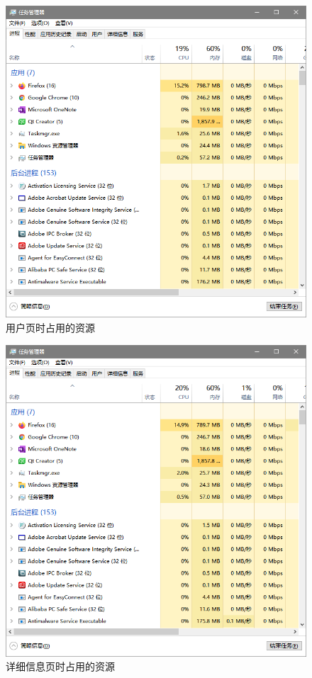\documentclass{beamer}
\begin{document}
\begin{frame}
    \begin{figure}
        \centering
        \includegraphics[scale=0.75]{../media/performance analyze/load usertab.png}
        \caption{用户页时占用的资源}
        \label{fig:useranaly}
    \end{figure}
\end{frame}

\begin{frame}
    \begin{figure}
        \centering
        \includegraphics[scale=0.75]{../media/performance analyze/load detailtab.png}
        \caption{详细信息页时占用的资源}
        \label{fig:detailanaly}
    \end{figure}
\end{frame}
\end{document}
